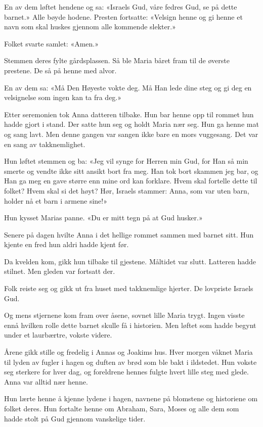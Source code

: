 En av dem løftet hendene og sa:
«Israels Gud, våre fedres Gud, se på dette barnet.»
Alle bøyde hodene.
Presten fortsatte:
«Velsign henne og gi henne et navn som
skal huskes gjennom alle kommende slekter.»

Folket svarte samlet:
«Amen.»

Stemmen deres fylte gårdsplassen.
Så ble Maria båret fram til de øverste prestene.
De så på henne med alvor.

En av dem sa:
«Må Den Høyeste vokte deg. Må Han lede dine steg og gi deg en
velsignelse som ingen kan ta fra deg.»

Etter seremonien tok Anna datteren tilbake.
Hun bar henne opp til rommet hun hadde gjort i stand.
Der satte hun seg og holdt Maria nær seg.
Hun ga henne mat og sang lavt.
Men denne gangen var sangen ikke bare en mors vuggesang.
Det var en sang av takknemlighet.

Hun løftet stemmen og ba:
«Jeg vil synge for Herren min Gud,
for Han så min smerte
og vendte ikke sitt ansikt bort fra meg.
Han tok bort skammen jeg bar,
og Han ga meg en gave større enn mine ord kan forklare.
Hvem skal fortelle dette til folket?
Hvem skal si det høyt?
Hør, Israels stammer:
Anna, som var uten barn,
holder nå et barn i armene sine!»

Hun kysset Marias panne. «Du er mitt tegn på at Gud husker.»

Senere på dagen hvilte Anna i det hellige rommet sammen med barnet sitt.
Hun kjente en fred hun aldri hadde kjent før.

Da kvelden kom, gikk hun tilbake til gjestene.
Måltidet var slutt.
Latteren hadde stilnet.
Men gleden var fortsatt der.

Folk reiste seg og gikk ut fra huset med takknemlige hjerter.
De lovpriste Israels Gud.

Og mens stjernene kom fram over åsene, sovnet lille Maria trygt.
Ingen visste ennå hvilken rolle dette barnet skulle få i historien.
Men løftet som hadde begynt under et laurbærtre, vokste videre.

Årene gikk stille og fredelig i Annas og Joakims hus.
Hver morgen våknet Maria til lyden av fugler i hagen og duften av
brød som ble bakt i ildstedet. Hun vokste seg sterkere for hver dag,
og foreldrene hennes fulgte hvert lille steg med glede.
Anna var alltid nær henne.

Hun lærte henne å kjenne lydene i hagen, navnene på blomstene og
historiene om folket deres. Hun fortalte henne om Abraham,
Sara, Moses og alle dem som hadde stolt på Gud gjennom vanskelige tider.

